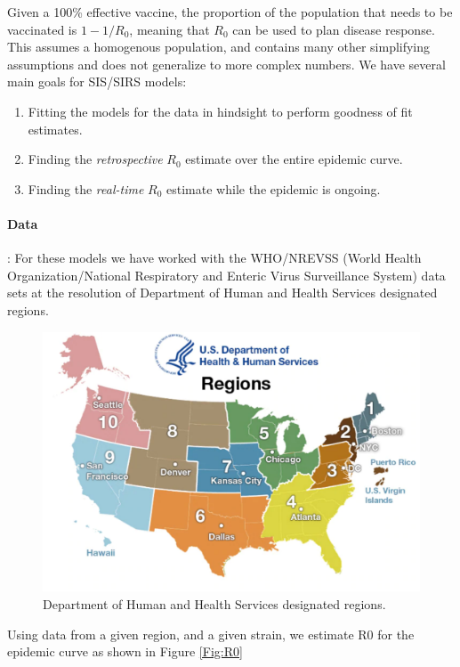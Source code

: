 \documentclass[11pt]{article}
\begin{document}
Given a 100\% effective vaccine, the proportion of the population that needs to be vaccinated is $1 - 1/R_0$, meaning that $R_0$ can be used to plan disease response.  This assumes a homogenous population, and contains many other simplifying assumptions and does not generalize to more complex numbers.  We have several main goals for SIS/SIRS models:

\begin{enumerate}
\item Fitting the models for the data in hindsight to perform goodness of fit estimates.
\item Finding the \emph{retrospective} $R_0$ estimate over the entire epidemic curve.
\item Finding the \emph{real-time} $R_0$ estimate while the epidemic is ongoing.
\end{enumerate}

\paragraph{Data}: For these models we have worked with the WHO/NREVSS (World Health Organization/National Respiratory and Enteric Virus Surveillance System) data sets at the resolution of Department of Human and Health Services designated regions.

\begin{figure}
\includegraphics[width=\textwidth]{figs/regionsmap.pdf}
\caption{Department of Human and Health Services designated regions.}
\label{Fig:Regions}
\end{figure}

Using data from a given region, and a given strain, we estimate R0 for the epidemic curve as shown in Figure \ref{Fig:R0}
\end{document}
